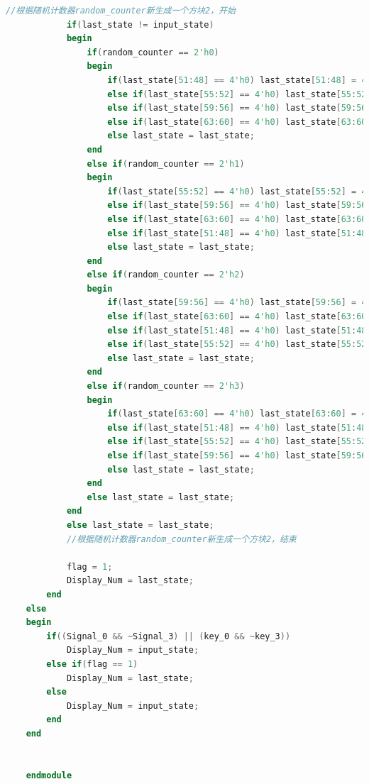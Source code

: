 \documentclass[UTF8]{article}
\begin{document}
\begin{lstlisting}[language=Verilog]
			//根据随机计数器random_counter新生成一个方块2，开始
			if(last_state != input_state)
			begin
				if(random_counter == 2'h0) 
				begin
					if(last_state[51:48] == 4'h0) last_state[51:48] = 4'h1;
					else if(last_state[55:52] == 4'h0) last_state[55:52] = 4'h1;
					else if(last_state[59:56] == 4'h0) last_state[59:56] = 4'h1;
					else if(last_state[63:60] == 4'h0) last_state[63:60] = 4'h1;
					else last_state = last_state;
				end
				else if(random_counter == 2'h1) 
				begin
					if(last_state[55:52] == 4'h0) last_state[55:52] = 4'h1;
					else if(last_state[59:56] == 4'h0) last_state[59:56] = 4'h1;
					else if(last_state[63:60] == 4'h0) last_state[63:60] = 4'h1;
					else if(last_state[51:48] == 4'h0) last_state[51:48] = 4'h1;
					else last_state = last_state;
				end
				else if(random_counter == 2'h2) 
				begin
					if(last_state[59:56] == 4'h0) last_state[59:56] = 4'h1;
					else if(last_state[63:60] == 4'h0) last_state[63:60] = 4'h1;
					else if(last_state[51:48] == 4'h0) last_state[51:48] = 4'h1;
					else if(last_state[55:52] == 4'h0) last_state[55:52] = 4'h1;
					else last_state = last_state;
				end
				else if(random_counter == 2'h3) 
				begin
					if(last_state[63:60] == 4'h0) last_state[63:60] = 4'h1;
					else if(last_state[51:48] == 4'h0) last_state[51:48] = 4'h1;
					else if(last_state[55:52] == 4'h0) last_state[55:52] = 4'h1;
					else if(last_state[59:56] == 4'h0) last_state[59:56] = 4'h1;
					else last_state = last_state;
				end
				else last_state = last_state;
			end
			else last_state = last_state;
			//根据随机计数器random_counter新生成一个方块2，结束
			
			flag = 1;
			Display_Num = last_state;
		end
	else
	begin
		if((Signal_0 && ~Signal_3) || (key_0 && ~key_3))
			Display_Num = input_state;
		else if(flag == 1)
			Display_Num = last_state;
		else
			Display_Num = input_state;
		end
	end
	
	
	endmodule
	\end{lstlisting}
	
\end{document}
